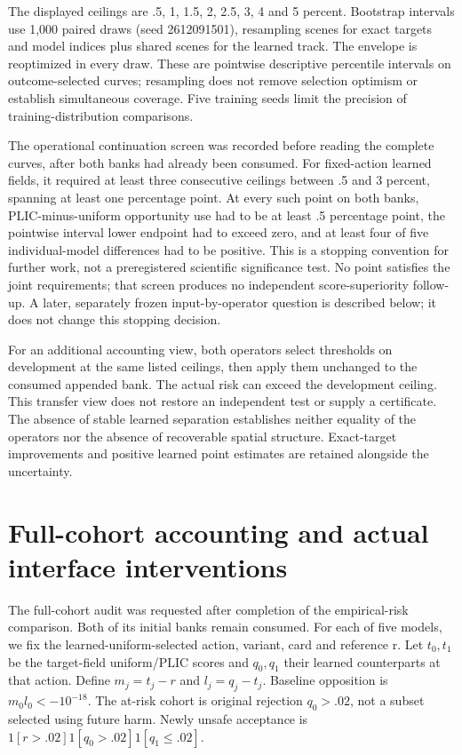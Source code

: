 The displayed ceilings are .5, 1, 1.5, 2, 2.5, 3, 4 and 5 percent. Bootstrap
intervals use 1,000 paired draws (seed 2612091501), resampling scenes for exact
targets and model indices plus shared scenes for the learned track. The
envelope is reoptimized in every draw. These are pointwise descriptive
percentile intervals on outcome-selected curves; resampling does not remove
selection optimism or establish simultaneous coverage. Five training seeds
limit the precision of training-distribution comparisons.



The operational continuation screen was recorded before reading the complete
curves, after both banks had already been consumed. For fixed-action learned
fields, it required at least three consecutive ceilings between .5 and 3 percent,
spanning at least one percentage point. At every such point on both banks,
PLIC-minus-uniform opportunity use had to be at least .5 percentage point,
the pointwise interval lower endpoint had to exceed zero, and at least four of
five individual-model differences had to be positive. This is a stopping
convention for further work, not a preregistered scientific significance test.
No point satisfies the joint requirements; that screen produces no independent
score-superiority follow-up. A later, separately frozen input-by-operator
question is described below; it does not change this stopping decision.

For an additional accounting view, both operators select thresholds on development
at the same listed ceilings, then apply them unchanged to the consumed appended
bank. The actual risk can exceed the development ceiling. This transfer view
does not restore an independent test or supply a certificate. The absence of
stable learned separation establishes neither equality of the operators nor
the absence of recoverable spatial structure. Exact-target improvements and
positive learned point estimates are retained alongside the uncertainty.

\section{Full-cohort accounting and actual interface interventions}
\label{app:fullcohort}
The full-cohort audit was requested after completion of the empirical-risk
comparison. Both of its initial banks remain consumed. For each of five models,
we fix the learned-uniform-selected action, variant, card and reference r.
Let $t_0,t_1$ be the target-field uniform/PLIC scores and $q_0,q_1$ their learned
counterparts at that action. Define $m_j=t_j-r$ and $l_j=q_j-t_j$.
Baseline opposition is $m_0l_0<-10^{-18}$. The at-risk cohort is original
rejection $q_0>.02$, not a subset selected using future harm. Newly unsafe
acceptance is $1[r>.02]1[q_0>.02]1[q_1\le.02]$.

